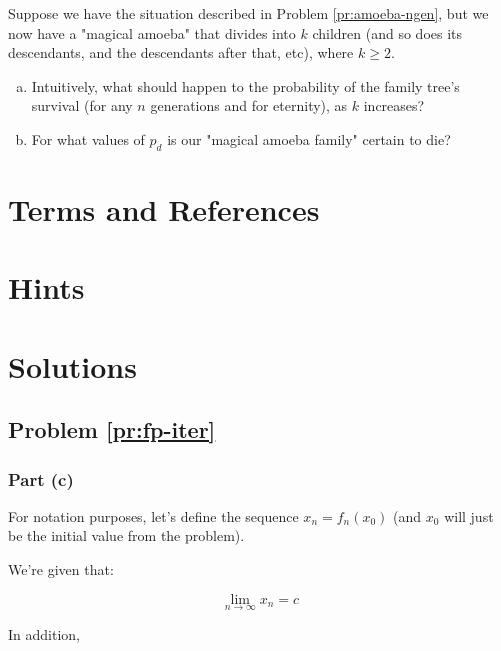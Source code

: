 \begin{problem}
\label{pr:amoeba-kdesc}
Suppose we have the situation described in Problem \ref{pr:amoeba-ngen}, but we now have a "magical amoeba" that divides into $k$ children (and so does its descendants, and the descendants after that, etc), where $k \geq 2$. 

\begin{enumerate}[(a)]
\item Intuitively, what should happen to the probability of the family tree's survival (for any $n$ generations and for eternity), as $k$ increases?
\item For what values of $p_d$ is our "magical amoeba family" certain to die?
\end{enumerate}
\end{problem}


\newpage
\section{Terms and References}

\section{Hints}

\newpage
\section{Solutions}

\subsection{Problem \ref{pr:fp-iter}}

\subsubsection{Part (c)}

For notation purposes, let's define the sequence $x_n = f_n(x_0)$ (and $x_0$ will just be the initial value from the problem).

We're given that:

\begin{equation*}
\lim_{n \rightarrow \infty} x_n = c
\end{equation*}

In addition,

